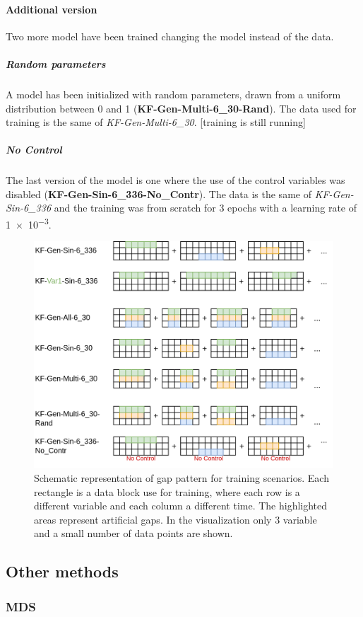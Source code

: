 \documentclass{article}
\let\Oldsubsection\subsection
\renewcommand{\subsection}{\FloatBarrier\Oldsubsection}
\begin{document}
\paragraph{Additional version} Two more model have been trained changing the model instead of the data.

\subparagraph{Random parameters} A model has been initialized with random parameters, drawn from a uniform distribution between 0 and 1 (\textbf{KF-Gen-Multi-6\_30-Rand}). The data used for training is the same of  \textit{KF-Gen-Multi-6\_30}. [training is still running]

\subparagraph{No Control} The last version of the model is one where the use of the control variables was disabled (\textbf{KF-Gen-Sin-6\_336-No\_Contr}). The data is the same of \textit{KF-Gen-Sin-6\_336} and the training was from scratch for \num{3} epochs with a learning rate of \num{1e-3}.

\begin{figure}
\centerline{\includegraphics[width=4.5in]{training scenarios}}
\caption{Schematic representation of gap pattern for training scenarios. Each rectangle is a data block use for training, where each row is a different variable and each column a different time. The highlighted areas represent artificial gaps. In the visualization only 3 variable and a small number of data points are shown.}
\label{fig:training}
\end{figure}

\subsection{Other methods}

\subsubsection{MDS}
\end{document}
